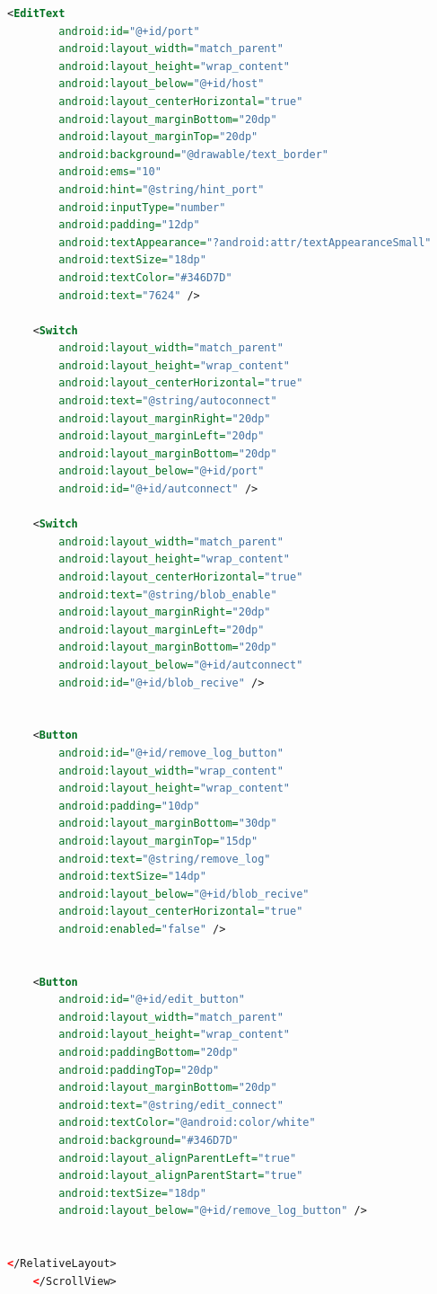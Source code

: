 \begin{lstlisting}[language=XML,caption={Vista de edición  XML de una propiedad},label={lst:lst:xml_edit_view}]
    <EditText
        android:id="@+id/port"
        android:layout_width="match_parent"
        android:layout_height="wrap_content"
        android:layout_below="@+id/host"
        android:layout_centerHorizontal="true"
        android:layout_marginBottom="20dp"
        android:layout_marginTop="20dp"
        android:background="@drawable/text_border"
        android:ems="10"
        android:hint="@string/hint_port"
        android:inputType="number"
        android:padding="12dp"
        android:textAppearance="?android:attr/textAppearanceSmall"
        android:textSize="18dp"
        android:textColor="#346D7D"
        android:text="7624" />

    <Switch
        android:layout_width="match_parent"
        android:layout_height="wrap_content"
        android:layout_centerHorizontal="true"
        android:text="@string/autoconnect"
        android:layout_marginRight="20dp"
        android:layout_marginLeft="20dp"
        android:layout_marginBottom="20dp"
        android:layout_below="@+id/port"
        android:id="@+id/autconnect" />

    <Switch
        android:layout_width="match_parent"
        android:layout_height="wrap_content"
        android:layout_centerHorizontal="true"
        android:text="@string/blob_enable"
        android:layout_marginRight="20dp"
        android:layout_marginLeft="20dp"
        android:layout_marginBottom="20dp"
        android:layout_below="@+id/autconnect"
        android:id="@+id/blob_recive" />


    <Button
        android:id="@+id/remove_log_button"
        android:layout_width="wrap_content"
        android:layout_height="wrap_content"
        android:padding="10dp"
        android:layout_marginBottom="30dp"
        android:layout_marginTop="15dp"
        android:text="@string/remove_log"
        android:textSize="14dp"
        android:layout_below="@+id/blob_recive"
        android:layout_centerHorizontal="true"
        android:enabled="false" />


    <Button
        android:id="@+id/edit_button"
        android:layout_width="match_parent"
        android:layout_height="wrap_content"
        android:paddingBottom="20dp"
        android:paddingTop="20dp"
        android:layout_marginBottom="20dp"
        android:text="@string/edit_connect"
        android:textColor="@android:color/white"
        android:background="#346D7D"
        android:layout_alignParentLeft="true"
        android:layout_alignParentStart="true"
        android:textSize="18dp"
        android:layout_below="@+id/remove_log_button" />


</RelativeLayout>
    </ScrollView>

\end{lstlisting}



